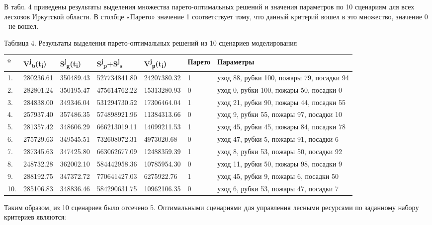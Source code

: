 \documentclass{article}
\begin{document}
В табл. 4 приведены результаты выделения множества 
парето-оптимальных решений и значения параметров 
по 10 сценариям для всех лесхозов Иркутской 
области. В столбце «Парето» значение 1 соответствует 
тому, что данный критерий вошел в это множество, 
значение 0 - не вошел. 

\begin{flushright}
Таблица 4. Результаты выделения парето-оптимальных 
решений из 10 сценариев моделирования

\begin{tabular}{|>{\raggedright}p{12pt}|>{\raggedright}p{50pt}|>{\raggedright}p{51pt}|>{\raggedright}p{73pt}|>{\raggedright}p{65pt}|>{\raggedright}p{23pt}|>{\raggedright}p{94pt}|}
\hline
º & V\textsuperscript{j}\textsubscript{b}(t\textsubscript{i}) & S\textsuperscript{j}\textsubscript{g}(t\textsubscript{i}) & S\textsuperscript{j}\textsubscript{p}+S\textsuperscript{j}\textsubscript{s} & V\textsuperscript{j}\textsubscript{р}(t\textsubscript{i}) & Парето & Параметры\tabularnewline
\hline
1.  & 280236.61 & 350489.43 & 527734841.80 & 24207380.32 & 1 & уход 88, рубки 
100, пожары 79, посадки 94\tabularnewline
\hline
2.  & 282801.24 & 350195.47 & 475614762.22 & 15313280.93 & 0 & уход 0, рубки 
100, пожары 50, посадки 0\tabularnewline
\hline
3.  & 284838.00 & 349346.04 & 531294730.52 & 17306464.04 & 1 & уход 21, рубки 
90, пожары 44, посадки 55\tabularnewline
\hline
4.  & 257937.40 & 357486.35 & 574898921.96 & 11384313.66 & 0 & уход 9, рубки 
55, пожары 97, посадки 10\tabularnewline
\hline
5.  & 281357.42 & 348606.29 & 666213019.11 & 14099211.53 & 1 & уход 45, рубки 
45, пожары 84, посадки 78\tabularnewline
\hline
6.  & 275729.63 & 349545.51 & 732608072.31 & 4973020.68 & 0 & уход 47, рубки 
5, пожары 91, посадки 6\tabularnewline
\hline
7.  & 287345.63 & 347425.80 & 663062677.09 & 12488359.39 & 1 & уход 8, рубки 
53, пожары 50, посадки 92\tabularnewline
\hline
8.  & 248732.28 & 362002.10 & 584442958.36 & 10785954.30 & 0 & уход 11, рубки 
50, пожары 98, посадки 9\tabularnewline
\hline
9.  & 288192.75 & 347372.72 & 770641427.03 & 6275922.76 & 1 & уход 45, рубки 
9, пожары 6, посадки 50\tabularnewline
\hline
10.  & 285106.83 & 348836.46 & 584290631.75 & 10962106.35 & 0 & уход 6, рубки 
53, пожары 47, посадки 7\tabularnewline
\hline
\end{tabular}
\end{flushright}

Таким образом, из 10 сценариев было отсечено 
5. Оптимальными сценариями для управления лесными 
ресурсами по заданному набору критериев являются: 
\end{document}
